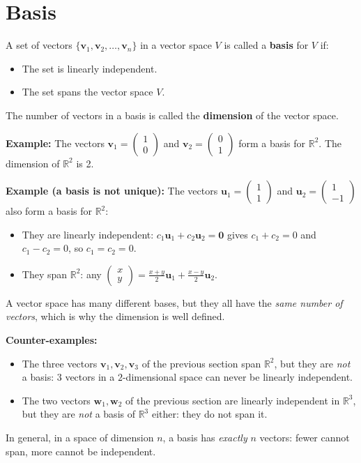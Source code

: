 \documentclass[]{article}
\begin{document}
	\section{Basis}
	
	A set of vectors $\{\mathbf{v}_1, \mathbf{v}_2, \dots, \mathbf{v}_n\}$ in a vector space $V$ is called a \textbf{basis} for $V$ if:
	\begin{itemize}
		\item The set is linearly independent.
		\item The set spans the vector space $V$.
	\end{itemize}
	
	The number of vectors in a basis is called the \textbf{dimension} of the vector space.
	
	\noindent \textbf{Example:}
	The vectors $\mathbf{v}_1 = \begin{pmatrix} 1 \\ 0 \end{pmatrix}$ and $\mathbf{v}_2 = \begin{pmatrix} 0 \\ 1 \end{pmatrix}$ form a basis for $\mathbb{R}^2$.
	The dimension of $\mathbb{R}^2$ is 2.

	\noindent \textbf{Example (a basis is not unique):}
	The vectors $\mathbf{u}_1 = \begin{pmatrix} 1 \\ 1 \end{pmatrix}$ and $\mathbf{u}_2 = \begin{pmatrix} 1 \\ -1 \end{pmatrix}$ also form a basis for $\mathbb{R}^2$:
	\begin{itemize}
		\item They are linearly independent: $c_1\mathbf{u}_1 + c_2\mathbf{u}_2 = \mathbf{0}$ gives $c_1 + c_2 = 0$ and $c_1 - c_2 = 0$, so $c_1 = c_2 = 0$.
		\item They span $\mathbb{R}^2$: any $\begin{pmatrix} x \\ y \end{pmatrix} = \frac{x+y}{2}\mathbf{u}_1 + \frac{x-y}{2}\mathbf{u}_2$.
	\end{itemize}
	A vector space has many different bases, but they all have the \textit{same number of vectors}, which is why the dimension is well defined.

	\noindent \textbf{Counter-examples:}
	\begin{itemize}
		\item The three vectors $\mathbf{v}_1, \mathbf{v}_2, \mathbf{v}_3$ of the previous section span $\mathbb{R}^2$, but they are \textit{not} a basis: $3$ vectors in a $2$-dimensional space can never be linearly independent.
		\item The two vectors $\mathbf{w}_1, \mathbf{w}_2$ of the previous section are linearly independent in $\mathbb{R}^3$, but they are \textit{not} a basis of $\mathbb{R}^3$ either: they do not span it.
	\end{itemize}
	In general, in a space of dimension $n$, a basis has \textit{exactly} $n$ vectors: fewer cannot span, more cannot be independent.
	
\end{document}
